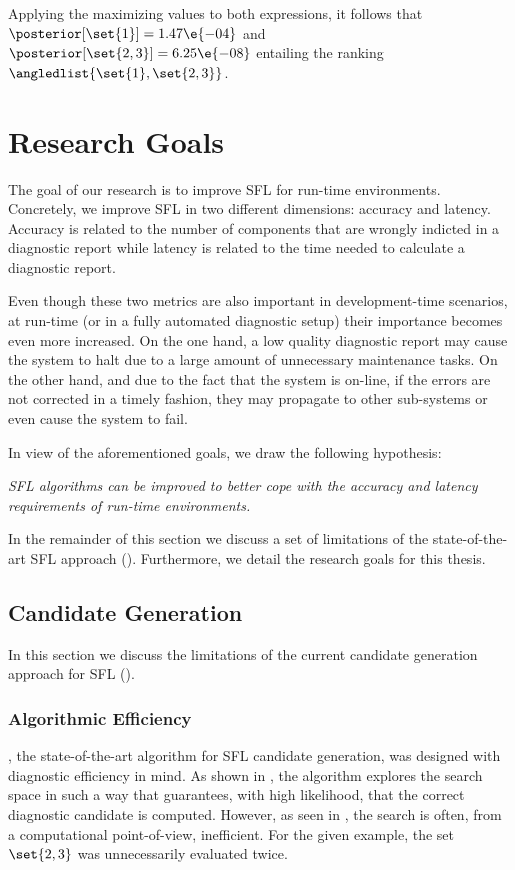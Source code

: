 Applying the maximizing values to both expressions, it follows that
$\posterior[\set{1}] = 1.47\e{-04}$ and
$\posterior[\set{2,3}] = 6.25\e{-08}$ entailing the ranking
$\angledlist{\set{1}, \set{2,3}}$.




\section{Research Goals}
\label{sec:intro:research-goals}
The goal of our research is to improve \ac{SFL} for run-time
environments.
%
Concretely, we improve \ac{SFL} in two different dimensions: accuracy
and latency.
%
Accuracy is related to the number of components that are wrongly
indicted in a diagnostic report while latency is related to the time
needed to calculate a diagnostic report.

Even though these two metrics are also important in development-time
scenarios, at run-time (or in a fully automated diagnostic setup)
their importance becomes even more increased.
%
On the one hand, a low quality diagnostic report may cause the system
to halt due to a large amount of unnecessary maintenance tasks.
%
On the other hand, and due to the fact that the system is on-line, if
the errors are not corrected in a timely fashion, they may propagate
to other sub-systems or even cause the system to fail.

In view of the aforementioned goals, we draw the following hypothesis:
\begin{center}
  \textit{\acl{SFL} algorithms can be improved to better cope with the
    accuracy and latency requirements of run-time environments.}
\end{center}

In the remainder of this section we discuss a set of limitations of
the state-of-the-art \ac{SFL} approach ().
%
Furthermore, we detail the research goals for this thesis.

\subsection{Candidate Generation}
\label{sec:intro:research-goals:candidate-generation}
In this section we discuss the limitations of the current candidate
generation approach for \ac{SFL}
().
%


\subsubsection{Algorithmic Efficiency}
\label{sec:intro:research-goals:algorithmic-efficiency}
\staccato{}, the state-of-the-art algorithm for \ac{SFL} candidate
generation, was designed with diagnostic efficiency in mind.
%
As shown in \citep{Abreu09b}, the algorithm explores the search space
in such a way that guarantees, with high likelihood, that the correct
diagnostic candidate is computed.
%
However, as seen in , the
search is often, from a computational point-of-view, inefficient.
%
For the given example, the set $\set{2,3}$ was unnecessarily evaluated
twice.

